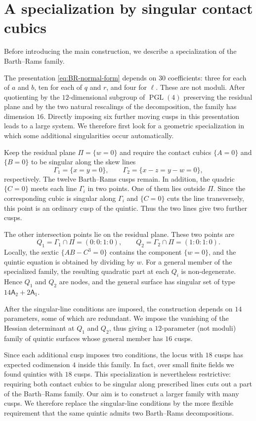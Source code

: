 \documentclass[10pt,a4paper]{article}
\begin{document}
\section{A specialization by singular contact cubics}
\label{sec:singular-lines}

Before introducing the main construction, we describe a specialization
of the Barth--Rams family.

The presentation \eqref{eq:BR-normal-form} depends
on $30$ coefficients: three for each of $a$ and $b$, ten for each of $q$ and
$r$, and four for $\ell$.  These are not moduli.  After quotienting by the
$12$-dimensional subgroup of $\operatorname{PGL}(4)$ preserving the residual
plane and by the two natural rescalings of the decomposition, the family has
dimension $16$.
Directly imposing six further moving cusps in this presentation leads to a
large system.  We therefore first look for a geometric specialization in which
some additional singularities occur automatically.

Keep the residual plane $\Pi=\{w=0\}$
and require the contact cubics $\{A=0\}$ and $\{B=0\}$ to be singular along the skew
lines
\[
        \Gamma_1=\{x=y=0\},
        \qquad
        \Gamma_2=\{x-z=y-w=0\},
\]
respectively.  The twelve Barth--Rams cusps remain.  In addition, the quadric
$\{C=0\}$ meets each line $\Gamma_i$ in two points.  One of them lies outside
$\Pi$.  Since the corresponding cubic is singular along $\Gamma_i$ and $\{C=0\}$
cuts the line transversely, this point is an ordinary cusp of the quintic.
Thus the two lines give two further cusps.

The other intersection points lie on the residual plane.  These two points are
\[
        Q_1=\Gamma_1\cap\Pi=(0:0:1:0),
        \qquad
        Q_2=\Gamma_2\cap\Pi=(1:0:1:0).
\]
Locally, the sextic $\{AB-C^3=0\}$ contains the component $\{w=0\}$, 
and the quintic equation is obtained by dividing by $w$.  
For a general member of the specialized family, the
resulting quadratic part at each $Q_i$ is non-degenerate.  Hence $Q_1$ and
$Q_2$ are nodes, and the general surface has singular set of type
$14\mathsf A_2+2\mathsf A_1.$

After the singular-line conditions are imposed, the construction depends on
$14$ parameters, some of which are redundant.  We impose the vanishing of the
Hessian determinant at $Q_1$ and $Q_2$, thus giving
a $12$-parameter (not moduli) family of quintic surfaces whose general member has $16$ cusps.

Since each additional cusp imposes two conditions, the locus with $18$ cusps
has expected codimension $4$ inside this family.  In fact, over small finite
fields we found quintics with $18$ cusps.  This specialization is nevertheless
restrictive: requiring both contact cubics to be singular along prescribed
lines cuts out a part of the Barth--Rams family.  Our aim is
to construct a larger family with many cusps.  We therefore replace the
singular-line conditions by the more flexible requirement that the same
quintic admits two Barth--Rams decompositions.
\end{document}
